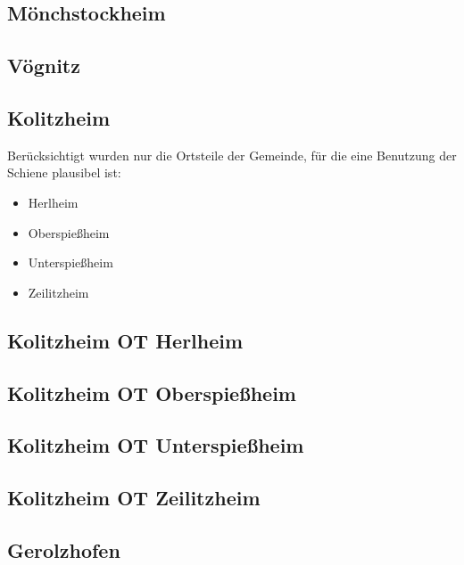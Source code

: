 \documentclass[fontsize=12pt,a4paper]{scrreprt}
\begin{document}
\subsection{Mönchstockheim}


\subsection{Vögnitz}


\subsection{Kolitzheim}
Berücksichtigt wurden nur die Ortsteile der Gemeinde, für die eine Benutzung der Schiene plausibel ist:
\begin{itemize}[nosep]
        \item Herlheim
        \item Oberspießheim
        \item Unterspießheim
        \item Zeilitzheim
\end{itemize}

\subsection{Kolitzheim OT Herlheim}


\subsection{Kolitzheim OT Oberspießheim}


\subsection{Kolitzheim OT Unterspießheim}


\subsection{Kolitzheim OT Zeilitzheim}


\subsection{Gerolzhofen}

\end{document}
